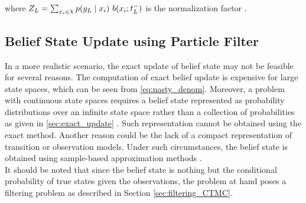 where $ Z_{L} = \sum_{x_{i}\in \rchi} p(y_{L} \mid x_{i})\ b(x_{i}; t_{L}^{-}) $ is the normalization factor \cite{article}.

\subsection{Belief State Update using Particle Filter}
\label{sec:particle_filter}
In a more realistic scenario, the exact update of belief state may not be feasible for several reasons. The computation of exact belief update is expensive for large state spaces, which can be seen from \autoref{eq:nasty_denom}. Moreover, a problem with continuous state spaces requires a belief state represented as probability distributions over an infinite state space rather than a collection of probabilities as given in \cref{sec:exact_update} \cite{Carlo1904}. Such representation cannot be obtained using the exact method. Another reason could be the lack of a compact representation of transition or observation models. Under such circumstances, the belief state is obtained using sample-based approximation methods \cite{Carlo1904}. \\
It should be noted that since the belief state is nothing but the conditional probability of true states given the observations, the problem at hand poses a filtering problem as described in Section \ref{sec:filtering_CTMC}.


